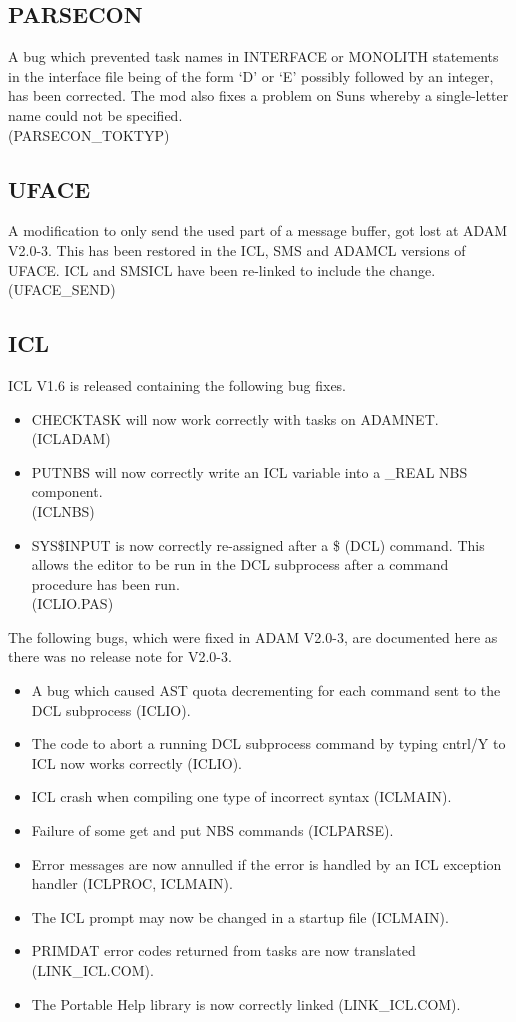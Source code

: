 \subsection{PARSECON}
A bug which prevented task names in INTERFACE or MONOLITH statements in the
interface file being of the form `D' or `E' possibly followed by
an integer, has been corrected. The mod also fixes a problem on Suns whereby a
single-letter name could not be specified.\\
(PARSECON\_TOKTYP)

\subsection{UFACE}
A modification to only send the used part of a message buffer, got lost at
ADAM V2.0-3. This has been restored in the ICL, SMS and ADAMCL versions of
UFACE.
ICL and SMSICL have been re-linked to include the change.\\(UFACE\_SEND)

\subsection{ICL}
ICL V1.6 is released containing the following bug fixes.
\begin{itemize}
\item CHECKTASK will now work correctly with tasks on ADAMNET.\\
(ICLADAM)
\item PUTNBS will now correctly write an ICL variable into a \_REAL NBS
component.\\
(ICLNBS)
\item SYS\$INPUT is now correctly re-assigned after a \$ (DCL) command.
This allows the editor to be run in the DCL subprocess after a
command procedure has been run.\\
(ICLIO.PAS)
\end{itemize}
The following bugs, which were fixed in ADAM V2.0-3, are documented here as
there was no release note for V2.0-3.
\begin{itemize}
\item A bug which caused AST quota decrementing for each command sent to
the DCL subprocess (ICLIO).
\item The code to abort a running DCL subprocess command by typing cntrl/Y
to ICL now works correctly (ICLIO).
\item ICL crash when compiling one type of incorrect syntax (ICLMAIN).
\item Failure of some get and put NBS commands (ICLPARSE).
\item Error messages are now annulled if the error is handled by an ICL
exception handler (ICLPROC, ICLMAIN).
\item The ICL prompt may now be changed in a startup file (ICLMAIN).
\item PRIMDAT error codes returned from tasks are now translated
(LINK\_ICL.COM).
\item The Portable Help library is now correctly linked (LINK\_ICL.COM).
\end{itemize}

